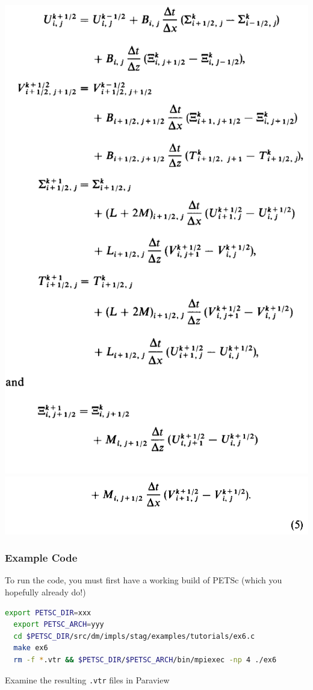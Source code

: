 \documentclass{beamer}
\begin{document}
\begin{frame}[fragile]
\begin{minipage}{0.44\textwidth}
\includegraphics[width=\textwidth]{images/virieux1986_eq5_part1.png}
\includegraphics[width=\textwidth]{images/virieux1986_eq5_part2.png}
  \end{minipage}
\end{frame}

\begin{frame}[fragile]
\frametitle{Example Code}
  To run the code, you must first have a working build of PETSc (which
  you hopefully already do!)
\begin{lstlisting}[language=bash,basicstyle=\scriptsize\ttfamily]
  export PETSC_DIR=xxx
  export PETSC_ARCH=yyy
  cd $PETSC_DIR/src/dm/impls/stag/examples/tutorials/ex6.c
  make ex6
  rm -f *.vtr && $PETSC_DIR/$PETSC_ARCH/bin/mpiexec -np 4 ./ex6
\end{lstlisting}
  Examine the resulting \texttt{.vtr} files in Paraview
\end{frame}
\end{document}
